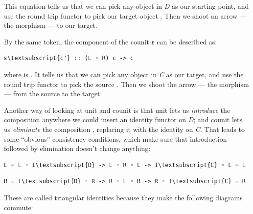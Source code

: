 This equation tells us that we can pick any object  in
\emph{D} as our starting point, and use the round trip functor
 to pick our target object . Then we
shoot an arrow --- the morphism  --- to our target.

\begin{figure}[H]
\centering
{}
\end{figure}

\noindent
By the same token, the component of the counit ε can be described as:

\begin{Verbatim}[commandchars=\\\{\}]
ε\textsubscript{c'} :: (L ◦ R) c -> c
\end{Verbatim}
where  is . It tells us that we
can pick any object  in \emph{C} as our target, and use the
round trip functor  to pick the source
. Then we shoot the arrow --- the morphism
 --- from the source to the target.

Another way of looking at unit and counit is that unit lets us
\emph{introduce} the composition  anywhere we could
insert an identity functor on \emph{D}; and counit lets us
\emph{eliminate} the composition , replacing it with the
identity on \emph{C}. That leads to some ``obvious'' consistency
conditions, which make sure that introduction followed by elimination
doesn't change anything:

\begin{Verbatim}[commandchars=\\\{\}]
L = L ◦ I\textsubscript{D} -> L ◦ R ◦ L -> I\textsubscript{C} ◦ L = L
\end{Verbatim}

\begin{Verbatim}[commandchars=\\\{\}]
R = I\textsubscript{D} ◦ R -> R ◦ L ◦ R -> R ◦ I\textsubscript{C} = R
\end{Verbatim}
These are called triangular identities because they make the following
diagrams commute:

